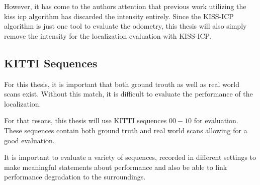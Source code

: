 However, it has come to the authors attention that previous work utilizing the kiss icp algorithm has discarded the intensity entirely. Since the KISS-ICP algorithm is just one tool to evaluate the odometry, this thesis will also simply remove the intensity for the localization evaluation with KISS-ICP. 




\subsection{KITTI Sequences}

For this thesis, it is important that both ground trouth as well as real world scans exist. Without this match, it is difficult to evaluate the performance of the localization. 

For that resons, this thesis will use KITTI sequences $ 00 - 10$ for evaluation. These sequences contain both ground truth and real world scans allowing for a good evaluation.

It is important to evaluate a variety of sequences, recorded in different settings to make meaningful statements about performance and also be able to link performance degradation to the surroundings. 



